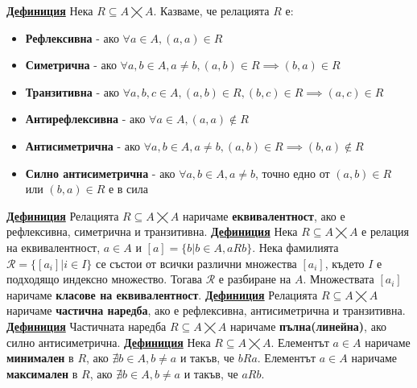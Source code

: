 \documentclass{article}
\begin{document}
\textbf{\underline{Дефиниция}}
Нека $R \subseteq A \bigtimes A$. Казваме, че релацията $R$ е:
\begin{itemize}
    \item \textbf{Рефлексивна} - ако $\forall a \in A, (a, a) \in R$
    \item \textbf{Симетрична} - ако $\forall a, b \in A, a \neq b, (a, b) \in R \implies (b, a) \in R$
    \item \textbf{Транзитивна} - ако $\forall a, b, c \in A, (a, b) \in R, (b, c) \in R \implies (a, c) \in R$
    \item \textbf{Антирефлексивна} - ако $\forall a \in A, (a, a) \notin R$
    \item \textbf{Антисиметрична} - ако $\forall a, b \in A, a \neq b, (a, b) \in R \implies (b, a) \notin R$
    \item \textbf{Силно антисиметрична} - ако $\forall a, b \in A, a \neq b$, точно едно от $(a, b) \in R$ или $(b, a) \in R$ е в сила
\end{itemize}
\textbf{\underline{Дефиниция}}
Релацията $R \subseteq A \bigtimes A$ наричаме \textbf{еквивалентност}, ако е рефлексивна, симетрична и транзитивна. \newline\newline
\textbf{\underline{Дефиниция}}
Нека $R \subseteq A \bigtimes A$ е релация на еквивалентност, $a \in A$ и $[a] = \{b | b \in A, aRb\}$.
Нека фамилията $\mathcal{R} = \{[a_i] | i \in I\}$ се състои от всички различни множества $[a_i]$, където
$I$ е подходящо индексно множество. Тогава $\mathcal{R}$ е разбиране на $A$. Множествата $[a_i]$ наричаме
\textbf{класове на еквивалентност}. \newline\newline
\textbf{\underline{Дефиниция}}
Релацията $R \subseteq A \bigtimes A$ наричаме \textbf{частична наредба}, ако е рефлексивна, антисиметрична и транзитивна. \newline\newline
\textbf{\underline{Дефиниция}}
Частичната наредба $R \subseteq A \bigtimes A$ наричаме \textbf{пълна(линейна)}, ако силно антисиметрична. \newline\newline
\textbf{\underline{Дефиниция}}
Нека $R \subseteq A \bigtimes A$. Елементът $a \in A$ наричаме \textbf{минимален} в $R$, ако $\nexists b \in A, b \neq a$ и
такъв, че $bRa$. Елементът $a \in A$ наричаме \textbf{максимален} в $R$, ако $\nexists b \in A, b \neq a$ и такъв, че $aRb$. \newline\newline
\end{document}
